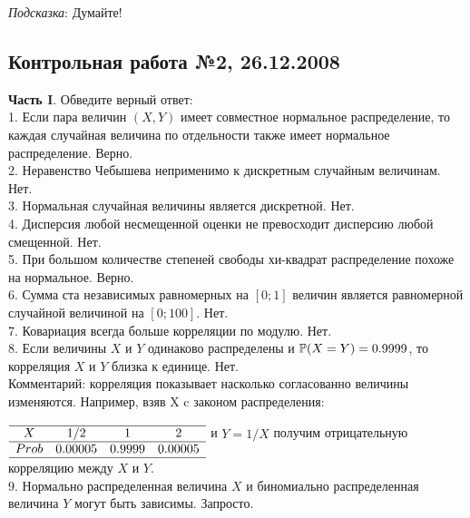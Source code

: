 \documentclass[12pt, a4paper]{article}\usepackage[]{graphicx}\usepackage[]{color}
\begin{document}
	\emph{Подсказка}: Думайте! \\

	\subsection{Контрольная работа №2, 26.12.2008}

	\textbf{Часть I}. Обведите верный ответ: \\

	1. Если пара величин $(X,Y)$ имеет совместное нормальное распределение, то каждая случайная величина по отдельности также имеет нормальное распределение. Верно. \\

	2. Неравенство Чебышева неприменимо к дискретным случайным величинам. Нет. \\

	3. Нормальная случайная величины является дискретной. Нет.
	\\

	4. Дисперсия любой несмещенной оценки не превосходит дисперсию любой смещенной. Нет. \\

	5. При большом количестве степеней свободы хи-квадрат распределение похоже на нормальное. Верно. \\

	6. Сумма ста независимых равномерных на $[0;1]$ величин является равномерной случайной величиной на $[0;100]$. Нет. \\

	7. Ковариация всегда больше корреляции по модулю.  Нет. \\

	8. Если величины $X$ и $Y$ одинаково распределены и $\P(X=Y)=0.9999$, то корреляция $X$ и $Y$ близка к единице. Нет. \\
	Комментарий: корреляция показывает насколько согласованно величины изменяются. Например, взяв X c законом распределения: \\
	$\begin{array}{cccc} \\
	\hline
	X & 1/2 & 1 & 2 \\
	\hline
	Prob & 0.00005 & 0.9999 & 0.00005 \\
	\hline
	\end{array}$
	и $Y=1/X$ получим отрицательную корреляцию между $X$ и $Y$. \\

	9. Нормально распределенная величина $X$ и биномиально распределенная величина $Y$ могут быть зависимы. Запросто. \\
\end{document}
